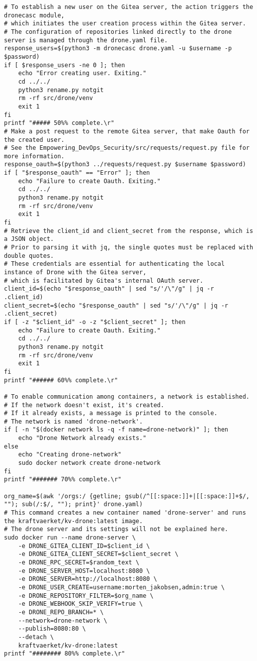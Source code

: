 \begin{verbatim}
# To establish a new user on the Gitea server, the action triggers the dronecasc module, 
# which initiates the user creation process within the Gitea server. 
# The configuration of repositories linked directly to the drone server is managed through the drone.yaml file.
response_users=$(python3 -m dronecasc drone.yaml -u $username -p $password)
if [ $response_users -ne 0 ]; then
    echo "Error creating user. Exiting."
    cd ../../
    python3 rename.py notgit
    rm -rf src/drone/venv
    exit 1
fi
printf "##### 50%% complete.\r"
# Make a post request to the remote Gitea server, that make Oauth for the created user.
# See the Empowering_DevOps_Security/src/requests/request.py file for more information.
response_oauth=$(python3 ../requests/request.py $username $password)
if [ "$response_oauth" == "Error" ]; then
    echo "Failure to create Oauth. Exiting."
    cd ../../
    python3 rename.py notgit
    rm -rf src/drone/venv
    exit 1
fi
# Retrieve the client_id and client_secret from the response, which is a JSON object. 
# Prior to parsing it with jq, the single quotes must be replaced with double quotes. 
# These credentials are essential for authenticating the local instance of Drone with the Gitea server, 
# which is facilitated by Gitea's internal OAuth server.
client_id=$(echo "$response_oauth" | sed "s/'/\"/g" | jq -r .client_id)
client_secret=$(echo "$response_oauth" | sed "s/'/\"/g" | jq -r .client_secret)
if [ -z "$client_id" -o -z "$client_secret" ]; then
    echo "Failure to create Oauth. Exiting."
    cd ../../
    python3 rename.py notgit
    rm -rf src/drone/venv
    exit 1
fi
printf "###### 60%% complete.\r"

# To enable communication among containers, a network is established. 
# If the network doesn't exist, it's created. 
# If it already exists, a message is printed to the console.
# The network is named 'drone-network'.
if [ -n "$(docker network ls -q -f name=drone-network)" ]; then
    echo "Drone Network already exists."
else
    echo "Creating drone-network"
    sudo docker network create drone-network
fi
printf "####### 70%% complete.\r"

org_name=$(awk '/orgs:/ {getline; gsub(/^[[:space:]]+|[[:space:]]+$/, ""); sub(/:$/, ""); print}' drone.yaml)
# This command creates a new container named 'drone-server' and runs the kraftvaerket/kv-drone:latest image.
# The drone server and its settings will not be explained here.
sudo docker run --name drone-server \
    -e DRONE_GITEA_CLIENT_ID=$client_id \
    -e DRONE_GITEA_CLIENT_SECRET=$client_secret \
    -e DRONE_RPC_SECRET=$random_text \
    -e DRONE_SERVER_HOST=localhost:8080 \
    -e DRONE_SERVER=http://localhost:8080 \
    -e DRONE_USER_CREATE=username:morten_jakobsen,admin:true \
    -e DRONE_REPOSITORY_FILTER=$org_name \
    -e DRONE_WEBHOOK_SKIP_VERIFY=true \
    -e DRONE_REPO_BRANCH=* \
    --network=drone-network \
    --publish=8080:80 \
    --detach \
    kraftvaerket/kv-drone:latest
printf "######## 80%% complete.\r"


\end{verbatim}
